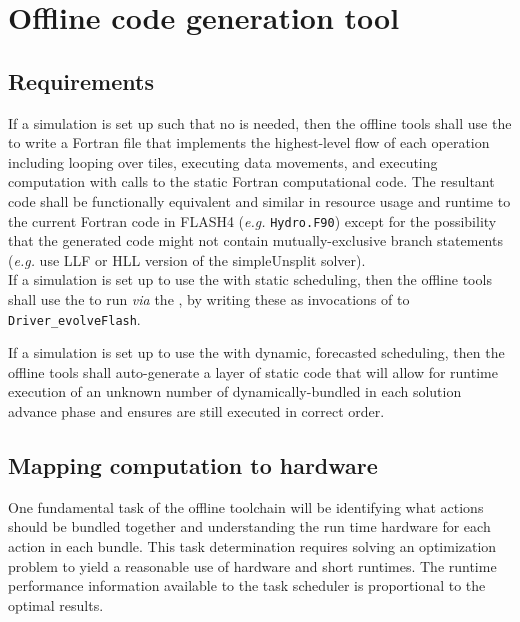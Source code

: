 \documentclass{article}
\begin{document}

\section{Offline code generation tool}
\subsection{Requirements}
If a simulation is set up such that no \OR is needed, then the offline tools
shall use the \AKG to write a Fortran file that implements the
highest-level flow of each operation including looping over tiles, executing
data movements, and executing computation with calls to the static Fortran
computational code.  The resultant code shall be functionally equivalent and
similar in resource usage and runtime to the current Fortran code in FLASH4
(\textit{e.g.} \texttt{Hydro.F90}) except for the possibility that the generated
code might not contain mutually-exclusive branch statements (\textit{e.g.} use
LLF or HLL version of the simpleUnsplit solver).\\

If a simulation is set up to use the \OR with static scheduling, then the
offline tools shall use the \AKG to run \taskcodebundles \textit{via}
the \OR, by writing these as \OR invocations of \actionroutinebundles to \texttt{Driver\_evolveFlash}.

If a simulation is set up to use the \OR with dynamic, forecasted scheduling,
then the offline tools shall auto-generate a layer of static code that will
allow for runtime execution of an unknown number of dynamically-bundled
\taskroutines in each solution advance phase and ensures \taskroutines are still executed in correct order.

\subsection{Mapping computation to hardware}
\label{sec:OptimizationPhaseTool}
One fundamental task of the offline toolchain will
be identifying what actions should be bundled together and understanding the
run time hardware for each action in each bundle.  This task determination
requires solving an optimization problem to
yield a reasonable use of hardware and short runtimes.  The runtime performance
information available to the task scheduler is proportional to the optimal results.
\\
\end{document}
